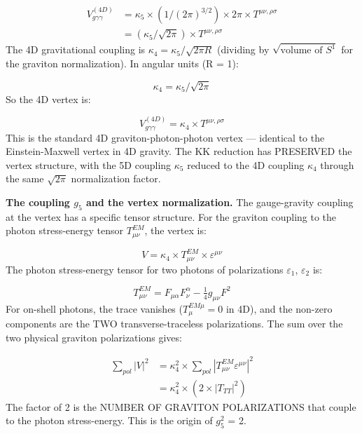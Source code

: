 \documentclass[aps,prd,preprint,superscriptaddress,longbibliography,floatfix]{revtex4-2}
\theoremstyle{remark}
\begin{document}
\begin{align}
    V_{g\gamma\gamma}^{(4D)} &= \kappa_{5} \times (1/(2\pi)^{3/2}) \times 2\pi \times T^{\mu\nu,\rho\sigma} \\
    & = (\kappa_{5}/\sqrt{2\pi}) \times T^{\mu\nu,\rho\sigma}
\end{align}
The 4D gravitational coupling is $\kappa_{4} = \kappa_{5}/\sqrt{2\pi R}$ (dividing by $\sqrt{\text{volume of }S^{1}}$ for the graviton normalization). In angular units (R = 1):


\begin{equation}
    \kappa_{4} = \kappa_{5}/\sqrt{2\pi}
\end{equation}
So the 4D vertex is:


\begin{equation}
    V_{g\gamma\gamma}^{(4D)} = \kappa_{4} \times T^{\mu\nu,\rho\sigma}
\end{equation}
This is the standard 4D graviton-photon-photon vertex --- identical to the Einstein-Maxwell vertex in 4D gravity. The KK reduction has PRESERVED the vertex structure, with the 5D coupling $\kappa_{5}$ reduced to the 4D coupling $\kappa_{4}$ through the same $\sqrt{2\pi}$ normalization factor.

\textbf{The coupling $g_{5}$ and the vertex normalization.} The gauge-gravity coupling at the vertex has a specific tensor structure. For the graviton coupling to the photon stress-energy tensor $T^{EM}_{\mu\nu}$, the vertex is:


\begin{equation}
    V = \kappa_{4} \times T^{EM}_{\mu\nu} \times \varepsilon^{\mu\nu}
\end{equation}
The photon stress-energy tensor for two photons of polarizations $\varepsilon_{1}$, $\varepsilon_{2}$ is:


\begin{equation}
    T^{EM}_{\mu\nu} = F_{\mu\alpha} F_\nu^\alpha - \tfrac{1}{4} g_{\mu\nu} F^{2}
\end{equation}
For on-shell photons, the trace vanishes ($T^{EM \mu}_{\mu} = 0$ in 4D), and the non-zero components are the TWO transverse-traceless polarizations. The sum over the two physical graviton polarizations gives:


\begin{align}
    \sum_{pol} |V|^{2} &= \kappa_{4}^{2} \times \sum_{pol} |T^{EM}_{\mu\nu} \varepsilon^{\mu\nu}|^{2} \\
    & = \kappa_{4}^{2} \times (2 \times |T_{TT}|^{2})
\end{align}
The factor of 2 is the NUMBER OF GRAVITON POLARIZATIONS that couple to the photon stress-energy. This is the origin of $g_{5}^{2}$ = 2.
\end{document}
